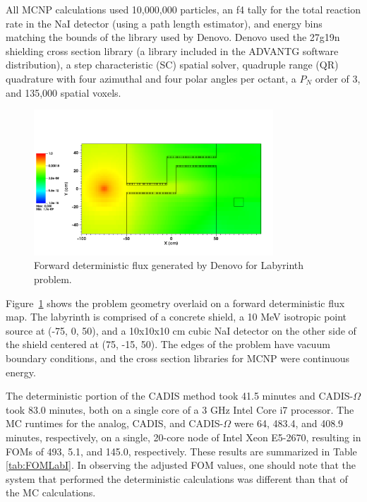 \documentclass[12pt]{article}
\begin{document}
All MCNP calculations used 10,000,000 particles, an f4 tally for the total reaction rate in the NaI detector (using a path length estimator), and energy bins matching the bounds of the library used by Denovo. 
Denovo used the 27g19n shielding cross section library (a library included in the ADVANTG software distribution), a step characteristic (SC) spatial solver, quadruple range (QR) quadrature with four azimuthal and four polar angles per octant, a $P_N$ order of 3, and 135,000 spatial voxels.%

\begin{figure}
  \begin{center}
    \includegraphics[width=0.80\textwidth]{./images/maze2_forward_group00_adjusted.png}
    \caption[]{\label{fig::fwdflux}Forward deterministic flux generated by Denovo for Labyrinth problem.}
  \end{center}
\end{figure}
Figure~\ref{fig::fwdflux} shows the problem geometry overlaid on a forward deterministic flux map. The labyrinth is comprised of a concrete shield, a 10 MeV isotropic point source at (-75, 0, 50), and a 10x10x10 cm cubic NaI detector on the other side of the shield centered at (75, -15, 50). The edges of the problem have vacuum boundary conditions, and the cross section libraries for MCNP were continuous energy. 

The deterministic portion of the CADIS method took 41.5 minutes and CADIS-$\Omega$ took 83.0 minutes, both on a single core of a 3 GHz Intel Core i7 processor. The MC runtimes for the analog, CADIS, and CADIS-$\Omega$ were 64, 483.4, and 408.9 minutes, respectively, on a single, 20-core node of Intel Xeon E5-2670, resulting in FOMs of 493, 5.1, and 145.0, respectively. These results are summarized in Table \ref{tab:FOMLabI}. In observing the adjusted FOM values, one should note that the system that performed the deterministic calculations was different than that of the MC calculations. 
\end{document}

